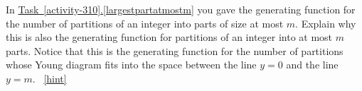 \documentclass{book}
\begin{document}
\setcounter{project}{318}
\addtocounter{project}{-1}
\begin{activity}[]\label{atmostmparts}
\hypertarget{p-1626}{}%
In \hyperref[largestpartatmostm]{Task~\ref{activity-310}.\ref{largestpartatmostm}} you gave the generating function for the number of partitions of an integer into parts of size at most \(m\). Explain why this is also the generating function for partitions of an integer into at most \(m\) parts. Notice that this is the generating function for the number of partitions whose Young diagram fits into the space between the line \(y=0\) and the line \(y=m\).%
~\hfill{\tiny\hyperlink{a-318}{[hint]}\hypertarget{q-318}{}}\end{activity}
\end{document}
